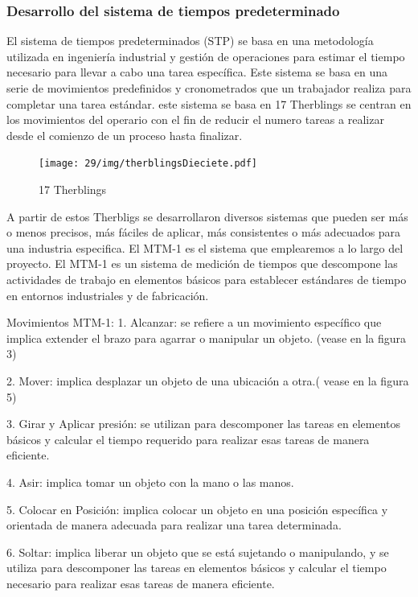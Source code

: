    \subsubsection{Desarrollo del sistema de tiempos predeterminado}
    El sistema de tiempos predeterminados (STP) se basa en una metodología  utilizada en ingeniería industrial y gestión de operaciones para estimar el tiempo necesario para llevar a cabo una tarea específica. Este sistema se basa en una serie de movimientos predefinidos y cronometrados que un trabajador realiza para completar una tarea estándar. este sistema se basa en 17 Therblings se centran en los movimientos del operario con el fin de reducir el numero tareas a realizar desde el comienzo de un proceso  hasta finalizar.
    \begin{figure}[H]
        \centering
        \texttt{[image: 29/img/therblingsDieciete.pdf]}
        \caption{17 Therblings }
        \label{fig:therblingsDieciete.pdf}
    \end{figure}
    A partir de estos Therbligs se desarrollaron diversos sistemas que pueden ser más o menos precisos, más fáciles de aplicar, más consistentes o más adecuados para una industria especifica. El MTM-1 es el sistema que emplearemos a lo largo del proyecto. El MTM-1 es un sistema de medición de tiempos que descompone las actividades de trabajo en elementos básicos para establecer estándares de tiempo en entornos industriales y de fabricación.
    
    Movimientos MTM-1:
    1. Alcanzar: se refiere a un movimiento específico que implica extender el brazo para agarrar o manipular un objeto. (vease en la figura 3)
    
    2. Mover: implica desplazar un objeto de una ubicación a otra.( vease en la figura 5)
    
    3. Girar y Aplicar presión: se utilizan para descomponer las tareas en elementos básicos y calcular el tiempo requerido para realizar esas tareas de manera eficiente.
    
    4. Asir: implica tomar un objeto con la mano o las manos.
    
    5. Colocar en Posición: implica colocar un objeto en una posición específica y orientada de manera adecuada para realizar una tarea determinada.
    
    6. Soltar: implica liberar un objeto que se está sujetando o manipulando, y se utiliza para descomponer las tareas en elementos básicos y calcular el tiempo necesario para realizar esas tareas de manera eficiente.
    
